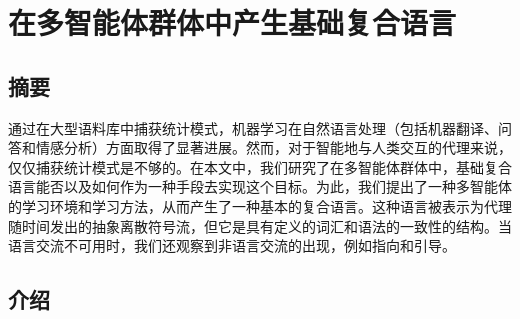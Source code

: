 %
%
%
%
%

\setcounter{chapter}{1}


\chapter{在多智能体群体中产生基础复合语言}
\label{chapter:1}

\section{摘要}

通过在大型语料库中捕获统计模式，机器学习在自然语言处理（包括机器翻译、问答和情感分析）方面取得了显著进展。然而，对于智能地与人类交互的代理来说，仅仅捕获统计模式是不够的。在本文中，我们研究了在多智能体群体中，基础复合语言能否以及如何作为一种手段去实现这个目标。为此，我们提出了一种多智能体的学习环境和学习方法，从而产生了一种基本的复合语言。这种语言被表示为代理随时间发出的抽象离散符号流，但它是具有定义的词汇和语法的一致性的结构。当语言交流不可用时，我们还观察到非语言交流的出现，例如指向和引导。

\section{介绍}

